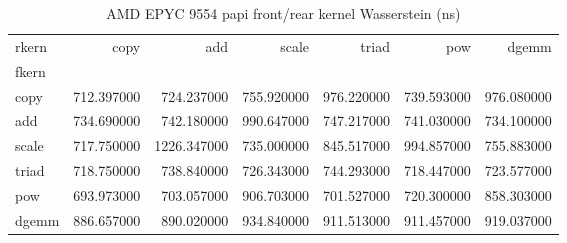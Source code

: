 \begin{table}
\caption{AMD EPYC 9554 papi front/rear kernel Wasserstein (ns)}
\begin{tabular}{lrrrrrr}
\toprule
rkern & copy & add & scale & triad & pow & dgemm \\
fkern &  &  &  &  &  &  \\
\midrule
copy & 712.397000 & 724.237000 & 755.920000 & 976.220000 & 739.593000 & 976.080000 \\
add & 734.690000 & 742.180000 & 990.647000 & 747.217000 & 741.030000 & 734.100000 \\
scale & 717.750000 & 1226.347000 & 735.000000 & 845.517000 & 994.857000 & 755.883000 \\
triad & 718.750000 & 738.840000 & 726.343000 & 744.293000 & 718.447000 & 723.577000 \\
pow & 693.973000 & 703.057000 & 906.703000 & 701.527000 & 720.300000 & 858.303000 \\
dgemm & 886.657000 & 890.020000 & 934.840000 & 911.513000 & 911.457000 & 919.037000 \\
\bottomrule
\end{tabular}
\end{table}
